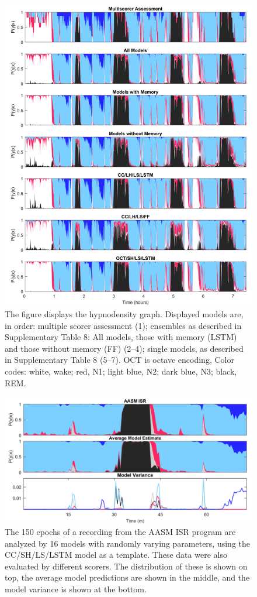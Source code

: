 \begin{figure}[tbh]
    \centering
    \includegraphics[width=\textwidth]{figures/paper-iii/Figure_2a}
    \caption{The figure displays the hypnodensity graph. Displayed models are, in order: multiple scorer assessment (1); ensembles as described in Supplementary Table 8: All models, those with memory (LSTM) and those without memory (FF) (2–4); single models, as described in Supplementary Table 8 (5–7). OCT is octave encoding, Color codes: white, wake; red, N1; light blue, N2; dark blue, N3; black, REM.}
    \label{fig:paperiii-figure02a}
\end{figure}
\begin{figure}[htb]
    \centering
    \includegraphics[width=\textwidth]{figures/paper-iii/Figure_2b}
    \caption{The 150 epochs of a recording from the AASM ISR program are analyzed by 16 models with randomly varying parameters, using the CC/SH/LS/LSTM model as a template. These data were also evaluated by  different scorers. The distribution of these is shown on top, the average model predictions are shown in the middle, and the model variance is shown at the bottom.}
    \label{fig:paperiii-figure02b}
\end{figure}
